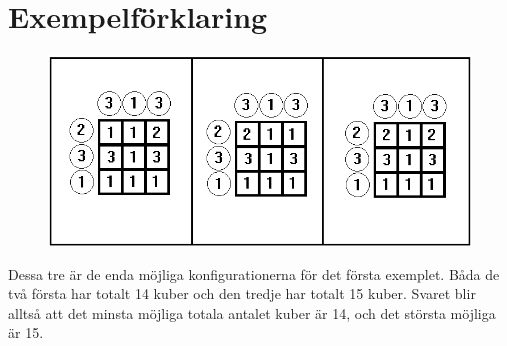 \section*{Exempelförklaring}
\begin{figure}[!h]
  \centering
      \includegraphics[width=.5\textwidth]{robotbild.png}
\end{figure}
Dessa tre är de enda möjliga konfigurationerna för det första exemplet. Båda de två första har totalt 14 kuber och den tredje har totalt 15 kuber. Svaret blir alltså att det minsta möjliga totala antalet kuber är 14, och det största möjliga är 15.
